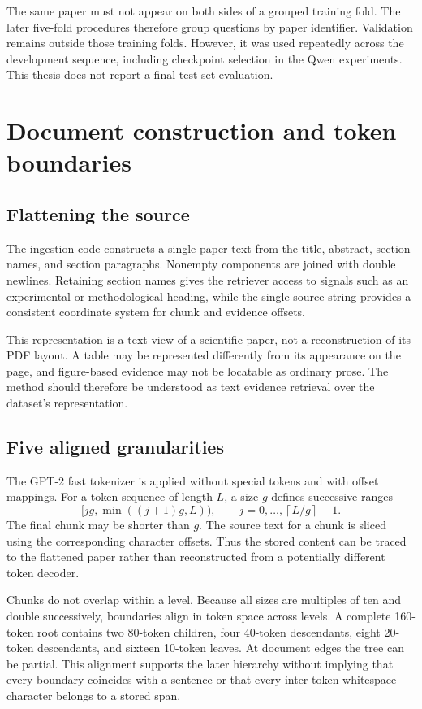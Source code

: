 The same paper must not appear on both sides of a grouped training
fold. The later five-fold procedures therefore group questions by
paper identifier. Validation remains outside those training folds.
However, it was used repeatedly across the development sequence,
including checkpoint selection in the Qwen experiments. This thesis
does not report a final test-set evaluation.

\section{Document construction and token boundaries}
\subsection{Flattening the source}
The ingestion code constructs a single paper text from the title,
abstract, section names, and section paragraphs. Nonempty components
are joined with double newlines. Retaining section names gives the
retriever access to signals such as an experimental or methodological
heading, while the single source string provides a consistent coordinate
system for chunk and evidence offsets.

This representation is a text view of a scientific paper, not a
reconstruction of its PDF layout. A table may be represented differently
from its appearance on the page, and figure-based evidence may not be
locatable as ordinary prose. The method should therefore be understood
as text evidence retrieval over the dataset's representation.

\subsection{Five aligned granularities}
The GPT-2 fast tokenizer is applied without special tokens and with
offset mappings. For a token sequence of length $L$, a size $g$ defines
successive ranges
\begin{equation}
[jg,\min((j+1)g,L)),\qquad
j=0,\ldots,\left\lceil L/g\right\rceil-1.
\label{eq:chunks}
\end{equation}
The final chunk may be shorter than $g$. The source text for a chunk is
sliced using the corresponding character offsets. Thus the stored
content can be traced to the flattened paper rather than reconstructed
from a potentially different token decoder.

Chunks do not overlap within a level. Because all sizes are multiples
of ten and double successively, boundaries align in token space across
levels. A complete 160-token root contains two 80-token children, four
40-token descendants, eight 20-token descendants, and sixteen 10-token
leaves. At document edges the tree can be partial. This alignment
supports the later hierarchy without implying that every boundary
coincides with a sentence or that every inter-token whitespace character
belongs to a stored span.

